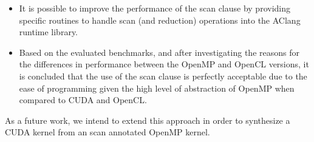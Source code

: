 \documentclass[Ingles]{ic-tese-v1}
\begin{document}
\begin{itemize}
	\item It is possible to improve  the performance of the scan clause by
	providing specific routines to handle scan (and reduction) operations
	into the AClang  runtime  library.
	\item Based on the evaluated benchmarks, and after investigating the
	reasons for the differences in performance between the OpenMP and
	OpenCL versions, it is concluded that the use of the scan clause is
	perfectly acceptable due to the ease of programming given the high
	level of abstraction of OpenMP when compared to CUDA and OpenCL.
\end{itemize}

As a future work, we intend to extend this approach in order  to synthesize a CUDA kernel
from an scan annotated  OpenMP kernel.



\end{document}
